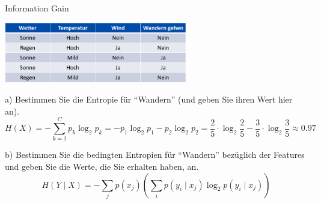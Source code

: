 \begin{example}{Information Gain}
    \begin{center}
        \includegraphics[width=0.6\textwidth]{includes/figures/example_information_gain.png}
    \end{center}



    a) Bestimmen Sie die Entropie für \enquote{Wandern} (und geben Sie ihren Wert hier an).
    \[
        H(X) = - \sum_{k=1}^{C} p_k \log_2 p_k = - p_1 \log_2 p_1 - p_2 \log_2 p_2 = \frac{2}{5} \cdot \log_2 \frac{2}{5} - \frac{3}{5} \cdot \log_2 \frac{3}{5} \approx 0.97
    \]

    b) Bestimmen Sie die bedingten Entropien für \enquote{Wandern} bezüglich der Features und geben Sie die Werte, die Sie erhalten haben, an.
    \[
        H(Y \mid X) = - \sum_j p(x_j) \left( \sum_i p(y_i \mid x_j) \log_2 p(y_i \mid x_j) \right)
    \]


\end{example}
